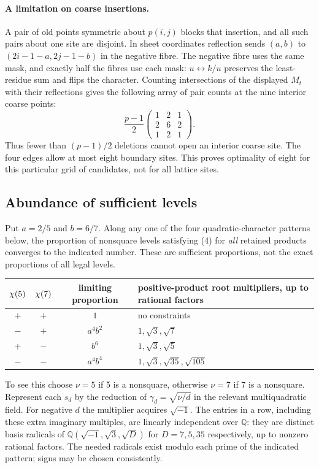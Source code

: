 \documentclass[11pt]{article}
\begin{document}
\paragraph{A limitation on coarse insertions.} A pair of old points symmetric about $p(i,j)$ blocks that insertion, and all such pairs about one site are disjoint. In sheet coordinates reflection sends $(a,b)$ to $(2i-1-a,2j-1-b)$ in the negative fibre. The negative fibre uses the same mask, and exactly half the fibres use each mask: $u\leftrightarrow k/u$ preserves the least-residue sum and flips the character. Counting intersections of the displayed $M_t$ with their reflections gives the following array of pair counts at the nine interior coarse points:
\[
 \frac{p-1}{2}\begin{pmatrix}1&2&1\\2&6&2\\1&2&1\end{pmatrix}.
\]
Thus fewer than $(p-1)/2$ deletions cannot open an interior coarse site. The four edges allow at most eight boundary sites. This proves optimality of eight for this particular grid of candidates, not for all lattice sites.

\subsection{Abundance of sufficient levels}
Put $a=2/5$ and $b=6/7$. Along any one of the four quadratic-character patterns below, the proportion of nonsquare levels satisfying (4) for \emph{all} retained products converges to the indicated number. These are sufficient proportions, not the exact proportions of all legal levels.
\begin{center}\begin{tabular}{cccl}\toprule
$\chi(5)$ & $\chi(7)$ & limiting proportion & positive-product root multipliers, up to rational factors\\\midrule
$+$ & $+$ & $1$ & no constraints\\
$-$ & $+$ & $a^4b^2$ & $1,\sqrt3,\sqrt7$\\
$+$ & $-$ & $b^6$ & $1,\sqrt3,\sqrt5$\\
$-$ & $-$ & $a^4b^4$ & $1,\sqrt3,\sqrt{35},\sqrt{105}$\\\bottomrule\end{tabular}\end{center}
To see this choose $\nu=5$ if 5 is a nonsquare, otherwise $\nu=7$ if 7 is a nonsquare. Represent each $s_d$ by the reduction of $\gamma_d=\sqrt{\nu/d}$ in the relevant multiquadratic field. For negative $d$ the multiplier acquires $\sqrt{-1}$. The entries in a row, including these extra imaginary multiples, are linearly independent over $\mathbb Q$: they are distinct basis radicals of $\mathbb Q(\sqrt{-1},\sqrt3,\sqrt D)$ for $D=7,5,35$ respectively, up to nonzero rational factors. The needed radicals exist modulo each prime of the indicated pattern; signs may be chosen consistently.
\end{document}
